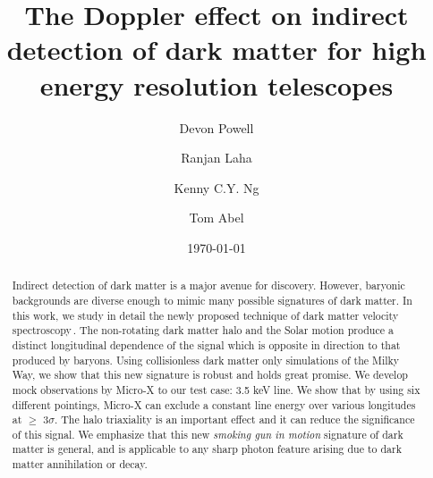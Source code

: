 \documentclass[aps,prd,10pt,twocolumn,superscriptaddress,showpacs,footinbib]{revtex4-1}
\begin{document}
\title{The Doppler effect on indirect detection of dark matter for high energy resolution telescopes}
\author{Devon Powell}
\author{Ranjan Laha}
\author{Kenny C.Y. Ng}
\author{Tom Abel}
\date{\today}

\begin{abstract}
Indirect detection of dark matter is a major avenue for discovery.  However, baryonic backgrounds are diverse enough to mimic many possible signatures of dark matter.  In this work, we study in detail the newly proposed technique of dark matter velocity spectroscopy\,\cite{speckhard2016}.   The non-rotating dark matter halo and the Solar motion produce a distinct longitudinal dependence of the signal which is opposite in direction to that produced by baryons.  Using collisionless dark matter only simulations of the Milky Way, we show that this new signature is robust and holds great promise.  We develop mock observations by Micro-X to our test case: 3.5 keV line.  We show that by using six different pointings, Micro-X can exclude a constant line energy over various longitudes at $\geq$ 3$\sigma$.  The halo triaxiality is an important effect and it can reduce the significance of this signal.  We emphasize that this new {\it smoking gun in motion} signature of dark matter is general, and is applicable to any sharp photon feature arising due to dark matter annihilation or decay.
\end{abstract}

\end{document}
